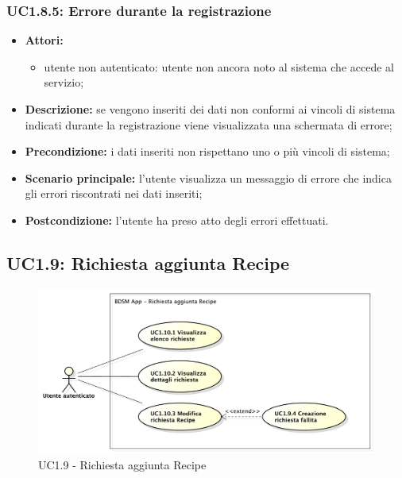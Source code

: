 \subsubsection{UC1.8.5: Errore durante la registrazione}
\begin{itemize}
	\item \textbf{Attori:}
	\begin{itemize}
		\item utente non autenticato: utente non ancora noto al sistema che accede al servizio;
	\end{itemize}
	\item \textbf{Descrizione:} se vengono inseriti dei dati non conformi ai vincoli di sistema indicati durante la registrazione viene visualizzata una schermata di errore;
	\item \textbf{Precondizione:} i dati inseriti non rispettano uno o più vincoli di sistema;
	\item \textbf{Scenario principale:} l'utente visualizza un messaggio di errore che indica gli errori riscontrati nei dati inseriti;
	\item \textbf{Postcondizione:} l'utente ha preso atto degli errori effettuati.
\end{itemize}

\pagebreak

\subsection{UC1.9: Richiesta aggiunta Recipe}
\begin{figure}[!htbp]
	\centering
	\centerline{\includegraphics[scale=0.50]{./images/UC1_9.pdf}}
	\caption{UC1.9 - Richiesta aggiunta Recipe}
\end{figure}

